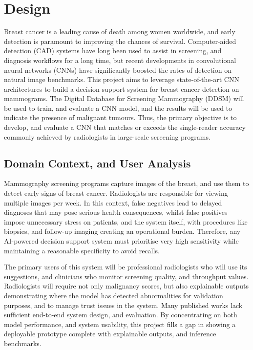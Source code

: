 \documentclass[../main]{subfiles}
\begin{document}
\chapter{Design}
Breast cancer is a leading cause of death among women worldwide, and early detection is paramount to improving the chances of survival. Computer-aided detection (CAD) systems have long been used to assist in screening, and diagnosis workflows for a long time, but recent developments in convolutional neural networks (CNNs) have significantly boosted the rates of detection on natural image benchmarks. This project aims to leverage state-of-the-art CNN architectures to build a decision support system for breast cancer detection on mammograms. The Digital Database for Screening Mammography (DDSM) will be used to train, and evaluate a CNN model, and the results will be used to indicate the presence of malignant tumours. Thus, the primary objective is to develop, and evaluate a CNN that matches or exceeds the single-reader accuracy commonly achieved by radiologists in large-scale screening programs.

\section{Domain Context, and User Analysis}
Mammography screening programs capture images of the breast, and use them to detect early signs of breast cancer. Radiologists are responsible for viewing multiple images per week. In this context, false negatives lead to delayed diagnoses that may pose serious health consequences, whilst false positives impose unnecessary stress on patients, and the system itself, with procedures like biopsies, and follow-up imaging creating an operational burden. Therefore, any AI-powered decision support system must prioritise very high sensitivity while maintaining a reasonable specificity to avoid recalls.

The primary users of this system will be professional radiologists who will use its suggestions, and clinicians who monitor screening quality, and throughput values. Radiologists will require not only malignancy scores, but also explainable outputs demonstrating where the model has detected abnormalities for validation purposes, and to manage trust issues in the system. Many published works lack sufficient end-to-end system design, and evaluation. By concentrating on both model performance, and system usability, this project fills a gap in showing a deployable prototype complete with explainable outputs, and inference benchmarks.
\end{document}
